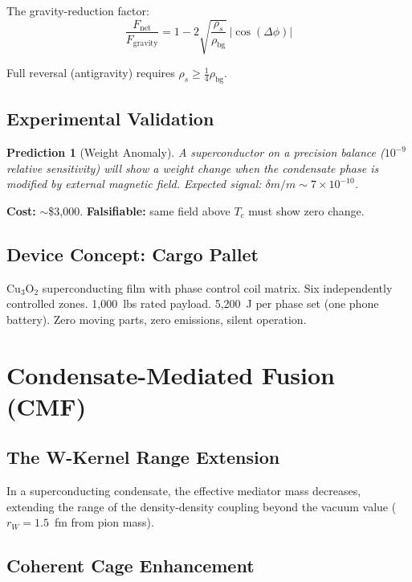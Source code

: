 \documentclass[11pt, a4paper]{article}
\newtheorem{prediction}{Prediction}[section]
\begin{document}
The gravity-reduction factor:
\begin{equation}
  \frac{F_{\text{net}}}{F_{\text{gravity}}} =
  1 - 2\sqrt{\frac{\rho_s}{\rho_{\text{bg}}}}\,
  |\cos(\Delta\phi)|
\end{equation}

Full reversal (antigravity) requires
$\rho_s \geq \frac{1}{4}\rho_{\text{bg}}$.

\subsection{Experimental Validation}

\begin{prediction}[Weight Anomaly]
A superconductor on a precision balance ($10^{-9}$ relative
sensitivity) will show a weight change when the condensate phase
is modified by external magnetic field. Expected signal:
$\delta m/m \sim 7 \times 10^{-10}$.
\end{prediction}

\textbf{Cost:} $\sim$\$3,000. \textbf{Falsifiable:} same field above
$T_c$ must show zero change.

\subsection{Device Concept: Cargo Pallet}

Cu$_3$O$_2$ superconducting film with phase control coil matrix.
Six independently controlled zones. 1,000~lbs rated payload.
5,200~J per phase set (one phone battery). Zero moving parts, zero
emissions, silent operation.

\section{Condensate-Mediated Fusion (CMF)}

\subsection{The W-Kernel Range Extension}

In a superconducting condensate, the effective mediator mass
decreases, extending the range of the density-density coupling
beyond the vacuum value ($r_W = 1.5$~fm from pion mass).

\subsection{Coherent Cage Enhancement}
\end{document}
